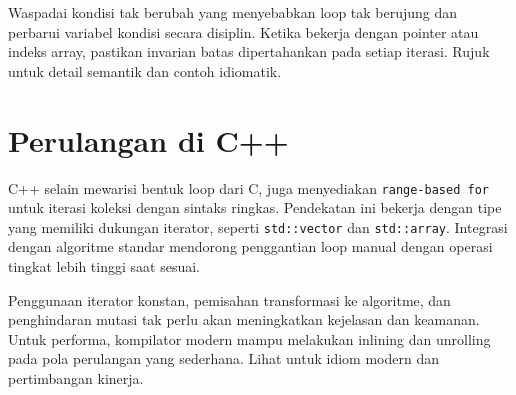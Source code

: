 \documentclass[../main.tex]{subfiles}
\begin{document}
Waspadai kondisi tak berubah yang menyebabkan loop tak berujung dan perbarui variabel kondisi secara disiplin. Ketika bekerja dengan pointer atau indeks array, pastikan invarian batas dipertahankan pada setiap iterasi. Rujuk \textcite{gnu-c-manual,iso-c-draft-n1570} untuk detail semantik dan contoh idiomatik.

\section{Perulangan di C++}
C++ selain mewarisi bentuk loop dari C, juga menyediakan \texttt{range-based for} untuk iterasi koleksi dengan sintaks ringkas. Pendekatan ini bekerja dengan tipe yang memiliki dukungan iterator, seperti \texttt{std::vector} dan \texttt{std::array}. Integrasi dengan algoritme standar mendorong penggantian loop manual dengan operasi tingkat lebih tinggi saat sesuai.

Penggunaan iterator konstan, pemisahan transformasi ke algoritme, dan penghindaran mutasi tak perlu akan meningkatkan kejelasan dan keamanan. Untuk performa, kompilator modern mampu melakukan inlining dan unrolling pada pola perulangan yang sederhana. Lihat \textcite{cpp-reference} untuk idiom modern dan pertimbangan kinerja.
\end{document}
